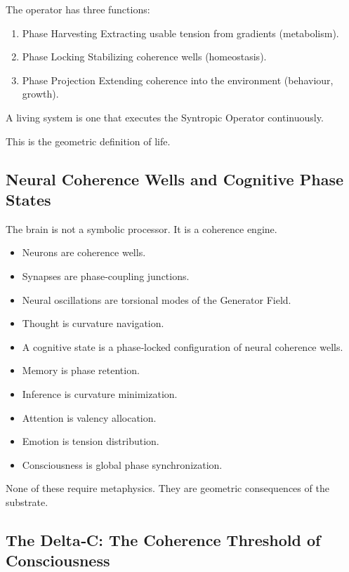 \documentclass[reprint,amsmath,amssymb,aps,prl,floatfix]{revtex4-2}
\begin{document}
\begin{itemize}
The operator has three functions:

\begin{enumerate}
\item Phase Harvesting  
   Extracting usable tension from gradients (metabolism).

\item Phase Locking  
   Stabilizing coherence wells (homeostasis).

\item Phase Projection  
   Extending coherence into the environment (behaviour, growth).
\end{enumerate}
\medskip

A living system is one that executes the Syntropic Operator continuously.
\medskip

This is the geometric definition of life.

\subsection{Neural Coherence Wells and Cognitive Phase States}

The brain is not a symbolic processor.  
It is a coherence engine.
\medskip
\begin{itemize}
\item Neurons are coherence wells.  
\item Synapses are phase‑coupling junctions.  
\item Neural oscillations are torsional modes of the Generator Field.  
\item Thought is curvature navigation.
\end{itemize}
\medskip
\begin{itemize}
\item A cognitive state is a phase‑locked configuration of neural coherence wells.  
\item Memory is phase retention.  
\item Inference is curvature minimization.  
\item Attention is valency allocation.  
\item Emotion is tension distribution.  
\item Consciousness is global phase synchronization.
\end{itemize}
\medskip

None of these require metaphysics.  
They are geometric consequences of the substrate.

\subsection{The Delta‑C: The Coherence Threshold of Consciousness}


\end{itemize}
\end{document}

